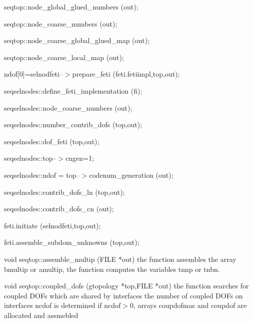 \hspace{20mm}  seqtop::node\_global\_glued\_numbers (out);

\hspace{20mm}  seqtop::node\_coarse\_numbers (out);

\hspace{20mm}  seqtop::node\_coarse\_global\_glued\_map (out);

\hspace{20mm}  seqtop::node\_coarse\_local\_map (out);

\hspace{10mm}  ndof[0]=selnodfeti--$>$prepare\_feti (feti.fetiimpl,top,out);

\hspace{20mm}  seqselnodes::define\_feti\_implementation (fi);

\hspace{20mm}  seqselnodes::node\_coarse\_numbers (out);

\hspace{20mm}  seqselnodes::number\_contrib\_dofs (top,out);

\hspace{20mm}  seqselnodes::dof\_feti (top,out);

\hspace{20mm}  seqselnodes::top--$>$cngen=1;

\hspace{20mm}  seqselnodes::ndof = top--$>$codenum\_generation (out);

\hspace{20mm}  seqselnodes::contrib\_dofs\_ln (top,out);

\hspace{20mm}  seqselnodes::contrib\_dofs\_cn (out);

\hspace{10mm}   feti.initiate (selnodfeti,top,out);

\hspace{10mm} feti.assemble\_subdom\_unknowns (top,out);

\noindent
{\color{red} void seqtop::assemble\_multip (FILE *out)}
the function assembles the array {\sf bmultip} or {\sf amultip},
the function computes the variables {\sf tnnp} or {\sf tnbn}.

\noindent
{\color{red} void seqtop::coupled\_dofs (gtopology *top,FILE *out)}
the function searches for coupled DOFs which are shared by interfaces
the number of coupled DOFs on interfaces {\sf ncdof} is determined
if {\sf ncdof}$>0$, arrays {\sf coupdofmas} and {\sf coupdof}
are allocated and assmebled

